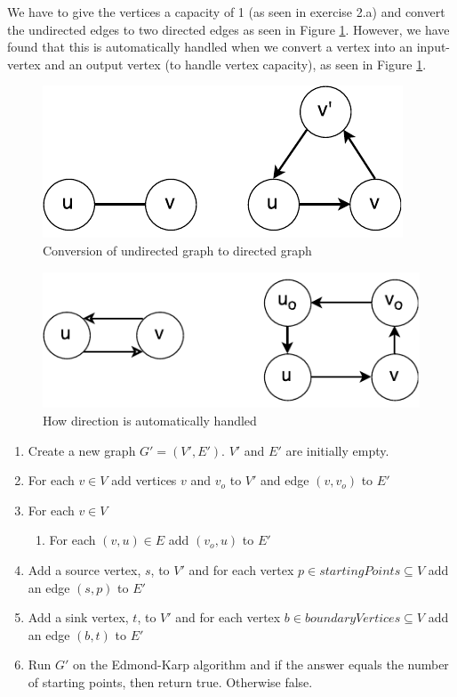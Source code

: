 \documentclass[koma,a4paper]{article}
\begin{document}
We have to give the vertices a capacity of 1 (as seen in exercise 2.a) and convert the undirected edges to two directed edges as seen in Figure \ref{fig:two_way1}. However, we have found that this is automatically handled when we convert a vertex into an input-vertex and an output vertex (to handle vertex capacity), as seen in Figure \ref{fig:two_way1}.
\begin{figure}
  \includegraphics{two_way_path}
  \caption{Conversion of undirected graph to directed graph}
  \label{fig:two_way1}
\end{figure}
\begin{figure}
  \includegraphics{two_way_path2}
  \caption{How direction is automatically handled}
  \label{fig:two_way2}
\end{figure}

\begin{enumerate}
  \item Create a new graph $G' = (V', E')$. $V'$ and $E'$ are initially empty.
  \item For each $v \in V$ add vertices $v$ and $v_o$ to $V'$ and edge $(v, v_o)$ to $E'$
  \item For each $v \in V$
  \begin{enumerate}
    \item For each $(v, u) \in E$ add $(v_o, u)$ to $E'$
  \end{enumerate}
  \item Add a source vertex, $s$, to $V'$ and for each vertex $p \in \mathit{startingPoints} \subseteq V$ add an edge $(s, p)$ to $E'$
  \item Add a sink vertex, $t$, to $V'$ and for each vertex $b \in \mathit{boundaryVertices} \subseteq V$ add an edge $(b, t)$ to $E'$
  \item Run $G'$ on the Edmond-Karp algorithm and if the answer equals the number of starting points, then return true. Otherwise false.
\end{enumerate}
\end{document}
